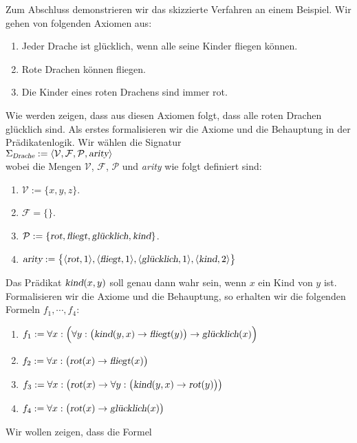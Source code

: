 \example
Zum Abschluss demonstrieren wir das skizzierte Verfahren an einem Beispiel.
Wir gehen von folgenden Axiomen aus:
\begin{enumerate}
\item Jeder Drache ist glücklich, wenn alle seine Kinder fliegen können.
\item Rote Drachen können fliegen.
\item Die Kinder eines roten Drachens sind immer rot.
\end{enumerate}
Wie werden zeigen, dass aus diesen Axiomen folgt, dass alle roten Drachen glücklich sind.
Als erstes formalisieren wir die Axiome und die Behauptung in der Prädikatenlogik.
Wir wählen die Signatur \\[0.2cm]
\hspace*{1.3cm}  $\Sigma_\textsl{Drache} := \langle \mathcal{V}, \mathcal{F}, \mathcal{P}, \textsl{arity} \rangle$ 
\\[0.2cm]
wobei die Mengen $\mathcal{V}$, $\mathcal{F}$, $\mathcal{P}$ und \textsl{arity} wie folgt definiert sind:
\begin{enumerate}
\item $\mathcal{V} := \{x,y,z\}$.
\item $\mathcal{F} = \{\}$.
\item $\mathcal{P} := \{ \textsl{rot}, \textsl{fliegt}, \textsl{glücklich}, \textsl{kind} \}$.
\item $\textsl{arity} := \bigl\{ \pair(\textsl{rot},1), \pair(\textsl{fliegt},1),
  \pair(\textsl{glücklich},1), \pair(\textsl{kind},2)\bigr\}$
\end{enumerate}
Das Prädikat  $\textsl{kind}(x,y)$ soll genau dann wahr sein, wenn $x$ ein Kind von $y$ ist.
Formalisieren wir die Axiome und die Behauptung, so erhalten wir die folgenden
Formeln $f_1, \cdots, f_4$:
\begin{enumerate}
\item $f_1 := \forall x: \Bigl(\forall y: \big(\textsl{kind}(y,x) \rightarrow \textsl{fliegt}(y)\big) \rightarrow \textsl{glücklich}(x)\Bigr)$
\item $f_2 := \forall x: \bigl(\textsl{rot}(x) \rightarrow \textsl{fliegt}(x)\bigr)$
\item $f_3 := \forall x: \bigl(\textsl{rot}(x) \rightarrow \forall y:\bigl( \textsl{kind}(y,x) \rightarrow \textsl{rot}(y)\bigr)\bigr)$
\item $f_4 := \forall x: \bigl(\textsl{rot}(x) \rightarrow \textsl{glücklich}(x)\bigr)$
\end{enumerate}
Wir wollen zeigen, dass die Formel 
